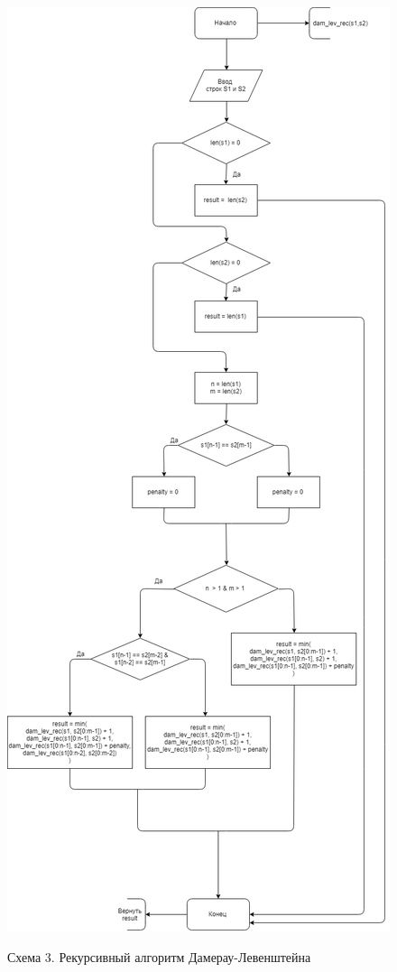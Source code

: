 \documentclass[12pt]{report}
\begin{document}
\begin{center}
    \includegraphics[scale=0.25]{dam_lev_rec}

    Схема 3. Рекурсивный алгоритм Дамерау-Левенштейна
\end{center}
\end{document}
